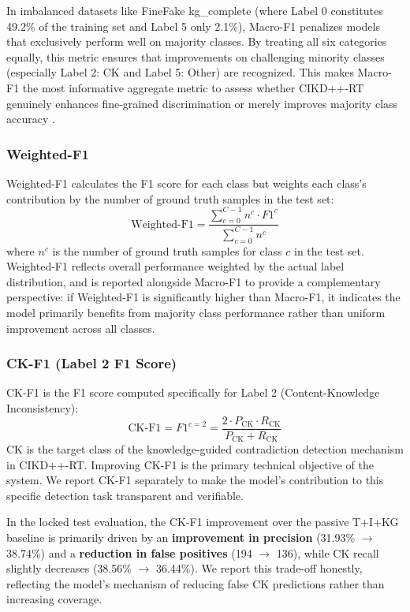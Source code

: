 In imbalanced datasets like FineFake kg\_complete (where Label 0 constitutes 49.2\% of the training set and Label 5 only 2.1\%), Macro-F1 penalizes models that exclusively perform well on majority classes. By treating all six categories equally, this metric ensures that improvements on challenging minority classes (especially Label 2: CK and Label 5: Other) are recognized. This makes Macro-F1 the most informative aggregate metric to assess whether CIKD++-RT genuinely enhances fine-grained discrimination or merely improves majority class accuracy \cite{ref40}.

\subsubsection{Weighted-F1}
Weighted-F1 calculates the F1 score for each class but weights each class's contribution by the number of ground truth samples in the test set:
\begin{equation}
\text{Weighted-F1} = \frac{\sum_{c=0}^{C-1} n^c \cdot F1^c}{\sum_{c=0}^{C-1} n^c}
\end{equation}
where $n^c$ is the number of ground truth samples for class $c$ in the test set. Weighted-F1 reflects overall performance weighted by the actual label distribution, and is reported alongside Macro-F1 to provide a complementary perspective: if Weighted-F1 is significantly higher than Macro-F1, it indicates the model primarily benefits from majority class performance rather than uniform improvement across all classes.

\subsubsection{CK-F1 (Label 2 F1 Score)}
CK-F1 is the F1 score computed specifically for Label 2 (Content-Knowledge Inconsistency):
\begin{equation}
\text{CK-F1} = F1^{c=2} = \frac{2 \cdot P_{\text{CK}} \cdot R_{\text{CK}}}{P_{\text{CK}} + R_{\text{CK}}}
\end{equation}
CK is the target class of the knowledge-guided contradiction detection mechanism in CIKD++-RT. Improving CK-F1 is the primary technical objective of the system. We report CK-F1 separately to make the model's contribution to this specific detection task transparent and verifiable.

In the locked test evaluation, the CK-F1 improvement over the passive T+I+KG baseline is primarily driven by an \textbf{improvement in precision} (31.93\% $\rightarrow$ 38.74\%) and a \textbf{reduction in false positives} (194 $\rightarrow$ 136), while CK recall slightly decreases (38.56\% $\rightarrow$ 36.44\%). We report this trade-off honestly, reflecting the model's mechanism of reducing false CK predictions rather than increasing coverage.

